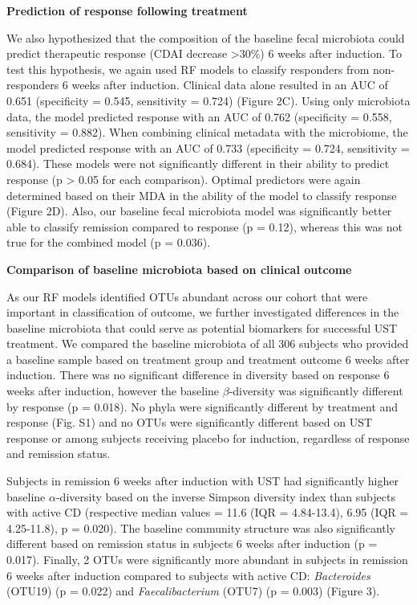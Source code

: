 \documentclass[12pt,]{article}
\begin{document}
\textbf{Prediction of response following treatment}

We also hypothesized that the composition of the baseline fecal
microbiota could predict therapeutic response (CDAI decrease
\textgreater{}30\%) 6 weeks after induction. To test this hypothesis, we
again used RF models to classify responders from non-responders 6 weeks
after induction. Clinical data alone resulted in an AUC of 0.651
(specificity = 0.545, sensitivity = 0.724) (Figure 2C). Using only
microbiota data, the model predicted response with an AUC of 0.762
(specificity = 0.558, sensitivity = 0.882). When combining clinical
metadata with the microbiome, the model predicted response with an AUC
of 0.733 (specificity = 0.724, sensitivity = 0.684). These models were
not significantly different in their ability to predict response (p
\textgreater{} 0.05 for each comparison). Optimal predictors were again
determined based on their MDA in the ability of the model to classify
response (Figure 2D). Also, our baseline fecal microbiota model was
significantly better able to classify remission compared to response (p
= 0.12), whereas this was not true for the combined model (p = 0.036).

\textbf{Comparison of baseline microbiota based on clinical outcome}

As our RF models identified OTUs abundant across our cohort that were
important in classification of outcome, we further investigated
differences in the baseline microbiota that could serve as potential
biomarkers for successful UST treatment. We compared the baseline
microbiota of all 306 subjects who provided a baseline sample based on
treatment group and treatment outcome 6 weeks after induction. There was
no significant difference in diversity based on response 6 weeks after
induction, however the baseline \({\beta}\)-diversity was significantly
different by response (p = 0.018). No phyla were significantly different
by treatment and response (Fig. S1) and no OTUs were significantly
different based on UST response or among subjects receiving placebo for
induction, regardless of response and remission status.

Subjects in remission 6 weeks after induction with UST had significantly
higher baseline \({\alpha}\)-diversity based on the inverse Simpson
diversity index than subjects with active CD (respective median values =
11.6 (IQR = 4.84-13.4), 6.95 (IQR = 4.25-11.8), p = 0.020). The baseline
community structure was also significantly different based on remission
status in subjects 6 weeks after induction (p = 0.017). Finally, 2 OTUs
were significantly more abundant in subjects in remission 6 weeks after
induction compared to subjects with active CD: \emph{Bacteroides}
(OTU19) (p = 0.022) and \emph{Faecalibacterium} (OTU7) (p = 0.003)
(Figure 3).
\end{document}
